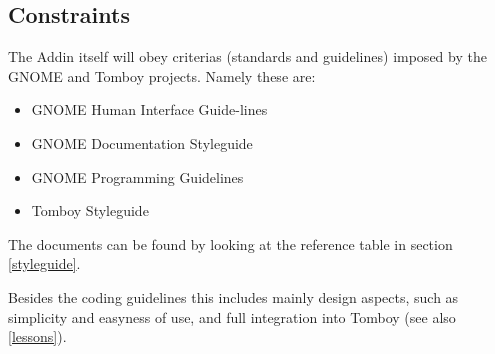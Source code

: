 \subsection{Constraints}
\label{description:constraints}
The Addin itself will obey criterias (standards and guidelines) imposed by the GNOME and Tomboy projects.
Namely these are:
\begin{itemize}
 \item GNOME Human Interface Guide-lines
 \item GNOME Documentation Styleguide
 \item GNOME Programming Guidelines
 \item Tomboy Styleguide %
\end{itemize}
The documents can be found by looking at the reference table in section \ref{styleguide}.

Besides the coding guidelines this includes mainly design aspects, such as simplicity and easyness of use, and full integration into Tomboy (see also \ref{lessons}).
